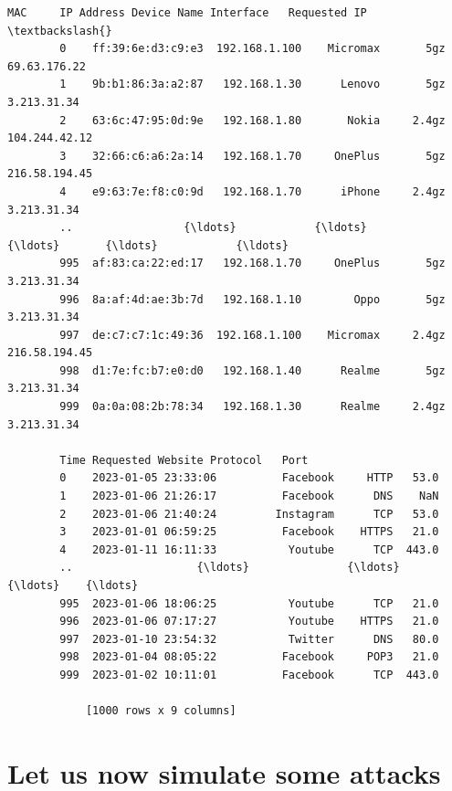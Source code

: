 \documentclass[11pt]{article}
\makeatletter
\newcommand{\boxspacing}{\kern\kvtcb@left@rule\kern\kvtcb@boxsep}
\newcommand{\prompt}[4]{
    {\ttfamily\llap{{\color{#2}[#3]:\hspace{3pt}#4}}\vspace{-\baselineskip}}
}
\makeatother
\begin{document}
\begin{tcolorbox}[breakable, size=fbox, boxrule=.5pt, pad at break*=1mm, opacityfill=0]
    \prompt{Out}{outcolor}{36}{\boxspacing}
    \begin{Verbatim}[commandchars=\\\{\}]
        MAC     IP Address Device Name Interface   Requested IP  \textbackslash{}
        0    ff:39:6e:d3:c9:e3  192.168.1.100    Micromax       5gz   69.63.176.22
        1    9b:b1:86:3a:a2:87   192.168.1.30      Lenovo       5gz    3.213.31.34
        2    63:6c:47:95:0d:9e   192.168.1.80       Nokia     2.4gz  104.244.42.12
        3    32:66:c6:a6:2a:14   192.168.1.70     OnePlus       5gz  216.58.194.45
        4    e9:63:7e:f8:c0:9d   192.168.1.70      iPhone     2.4gz    3.213.31.34
        ..                 {\ldots}            {\ldots}         {\ldots}       {\ldots}            {\ldots}
        995  af:83:ca:22:ed:17   192.168.1.70     OnePlus       5gz    3.213.31.34
        996  8a:af:4d:ae:3b:7d   192.168.1.10        Oppo       5gz    3.213.31.34
        997  de:c7:c7:1c:49:36  192.168.1.100    Micromax     2.4gz  216.58.194.45
        998  d1:7e:fc:b7:e0:d0   192.168.1.40      Realme       5gz    3.213.31.34
        999  0a:0a:08:2b:78:34   192.168.1.30      Realme     2.4gz    3.213.31.34

        Time Requested Website Protocol   Port
        0    2023-01-05 23:33:06          Facebook     HTTP   53.0
        1    2023-01-06 21:26:17          Facebook      DNS    NaN
        2    2023-01-06 21:40:24         Instagram      TCP   53.0
        3    2023-01-01 06:59:25          Facebook    HTTPS   21.0
        4    2023-01-11 16:11:33           Youtube      TCP  443.0
        ..                   {\ldots}               {\ldots}      {\ldots}    {\ldots}
        995  2023-01-06 18:06:25           Youtube      TCP   21.0
        996  2023-01-06 07:17:27           Youtube    HTTPS   21.0
        997  2023-01-10 23:54:32           Twitter      DNS   80.0
        998  2023-01-04 08:05:22          Facebook     POP3   21.0
        999  2023-01-02 10:11:01          Facebook      TCP  443.0

            [1000 rows x 9 columns]
    \end{Verbatim}
\end{tcolorbox}

\hypertarget{let-us-now-simulate-some-attacks}{%
    \section{Let us now simulate some
      attacks}\label{let-us-now-simulate-some-attacks}}
\end{document}
